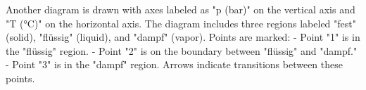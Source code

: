 Another diagram is drawn with axes labeled as "p (bar)" on the vertical axis and "T (°C)" on the horizontal axis. The diagram includes three regions labeled "fest" (solid), "flüssig" (liquid), and "dampf" (vapor).  
Points are marked:  
- Point "1" is in the "flüssig" region.  
- Point "2" is on the boundary between "flüssig" and "dampf."  
- Point "3" is in the "dampf" region.  
Arrows indicate transitions between these points.